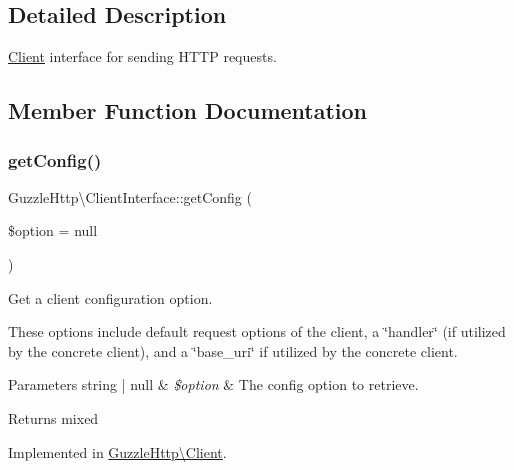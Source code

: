 \subsection{Detailed Description}
\hyperlink{classGuzzleHttp_1_1Client}{Client} interface for sending H\+T\+TP requests. 

\subsection{Member Function Documentation}
\mbox{\label{interfaceGuzzleHttp_1_1ClientInterface_a6d7e09251742f6a1227bd4abce2106e5}} 
\subsubsection{\texorpdfstring{get\+Config()}{getConfig()}}
{\footnotesize\ttfamily Guzzle\+Http\textbackslash{}\+Client\+Interface\+::get\+Config (\begin{DoxyParamCaption}\item[{}]{\$option = {\ttfamily null} }\end{DoxyParamCaption})}

Get a client configuration option.

These options include default request options of the client, a \char`\"{}handler\char`\"{} (if utilized by the concrete client), and a \char`\"{}base\+\_\+uri\char`\"{} if utilized by the concrete client.


\begin{DoxyParams}[1]{Parameters}
string | null & {\em \$option} & The config option to retrieve.\\
\hline
\end{DoxyParams}
\begin{DoxyReturn}{Returns}
mixed 
\end{DoxyReturn}


Implemented in \hyperlink{classGuzzleHttp_1_1Client_a59c5b1700f8222c52f8c55301502b462}{Guzzle\+Http\textbackslash{}\+Client}.

\mbox{\label{interfaceGuzzleHttp_1_1ClientInterface_a959a9c53eb4f138e1480e8e8b20ee71d}} 
